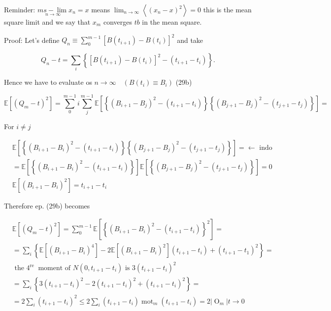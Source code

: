Reminder: $\underset{n \rightarrow \infty}{m s-\lim } x_{n}=x$ means $\lim _{n \rightarrow 
\infty}\left\langle\left(x_{n}-x\right)^{2}\right\rangle=0$ this is the mean square limit and we say that $x_{m}$ converges $t b$ in the mean square.

Proof: Let's define $Q_{n} \equiv \sum_{0}^{m-1}\left[B\left(t_{i+1}\right)-B\left(t_{i}\right)\right]^{2}$ and take

$$
 Q_{n}-t=\sum_{i}\left\{\left[B\left(t_{i+1}\right)-B\left(t_{i}\right)\right]^{2}-\left(t_{i+1}-t_{i}\right)\right\} .
$$ 

Hence we have to evaluate os $n \rightarrow \infty \quad\left(B\left(t_{i}\right) \equiv B_{i}\right)$
(29b)

$$
 \mathbb{E}\left[
\left(Q_{m}-t\right)^{2}\right]=\sum_{0}^{m-1} i \sum_{j}^{m-1} \mathbb{E}\left[\left\{\left(B_{i+1}-B_{j}\right)^{2}-\left(t_{i+1}-t_{i}\right)\right\}\left\{\left(B_{j+1}-B_{j}\right)^{2}-\left(t_{j+1}-t_{j}\right)\right\}\right]=
$$ 

For $i \neq j$

$$
 \begin{aligned}
& \mathbb{E}\left[\left\{\left(B_{i+1}-B_{i}\right)^{2}-\left(t_{i+1}-t_{i}\right)\right\}\left\{\left(B_{j+1}-B_{j}\right)^{2}-\left(t_{j+1}-t_{j}\right)\right\}\right]=\leftarrow \text{ indo } \\
&= \mathbb{E}\left[\left\{\left(B_{i+1}-B_{i}\right)^{2}-\left(t_{i+1}-t_{i}\right)\right\}\right] \mathbb{E}\left[\left\{\left(B_{j+1}-B_{j}\right)^{2}-\left(t_{j+1}-t_{j}\right)\right\}\right]=0 \\
& \mathbb{E}\left[
\left(B_{i+1}-B_{i}\right)^{2}\right]=t_{i+1}-t_{i}
\end{aligned}
$$ 

Therefore ep. (29b) becomes

$$
 \begin{aligned}
& \mathbb{E}\left[
\left(Q_{m}-t\right)^{2}\right]=\sum_{0}^{m-1} \mathbb{E}\left[\left\{\left(B_{i+1}-B_{i}\right)^{2}-\left(t_{i+1}-t_{i}\right)\right\}^{2}\right]=
 \\
& =\sum_{i}\left\{\mathbb{E}\left[
\left(B_{i+1}-B_{i}\right)^{4}\right]-2 \mathbb{E}\left[
\left(B_{i+1}-B_{i}\right)^{2}\right]\left(t_{i+1}-t_{i}\right)+\left(t_{i+1}-t_{1}\right)^{2}\right\}=
 \\
& \text{ the } 4^{\text{re }} \text{ moment of } N\left(0, t_{i+1}-t_{i}\right) \text{ is } 3\left(t_{i+1}-t_{i}\right)^{2} \\
& =\sum_{i}\left\{3\left(t_{i+1}-t_{i}\right)^{2}-2\left(t_{i+1}-t_{i}\right)^{2}+\left(t_{i+1}-t_{i}\right)^{2}\right\}=
 \\
& =2 \sum_{i}\left(t_{i+1}-t_{i}\right)^{2} \leq 2 \sum_{i}\left(t_{i+1}-t_{i}\right) \operatorname{mot}_{m}\left(t_{i+1}-t_{i}\right)=2\left|\operatorname{O}_{m}\right| t \rightarrow 0
\end{aligned}
$$ 

